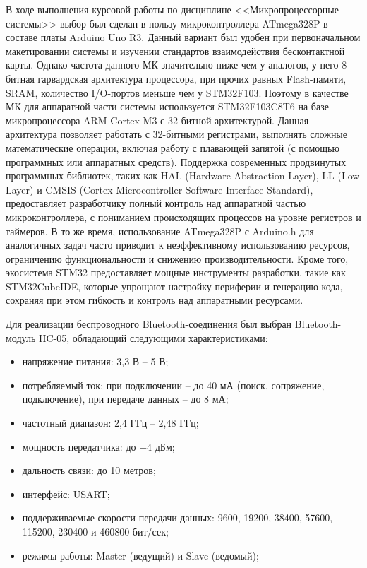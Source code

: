 В ходе выполнения курсовой работы по дисциплине <<Микропроцессорные системы>> выбор был сделан в пользу микроконтроллера ATmega328P в составе платы Arduino Uno R3.
Данный вариант был удобен при первоначальном макетировании системы и изучении стандартов взаимодействия бесконтактной карты.
Однако частота данного МК значительно ниже чем у аналогов, у него 8-битная гарвардская архитектура процессора, при прочих равных Flash-памяти, SRAM, количество I/O-портов меньше чем у STM32F103.
Поэтому в качестве МК для аппаратной части системы используется STM32F103C8T6 на базе микропроцессора ARM Cortex-M3 с 32-битной архитектурой.
Данная архитектура позволяет работать с 32-битными регистрами, выполнять сложные математические операции, включая работу с плавающей запятой (с помощью программных или аппаратных средств).
Поддержка современных продвинутых программных библиотек, таких как HAL (Hardware Abstraction Layer), LL (Low Layer) и CMSIS (Cortex Microcontroller Software Interface Standard), предоставляет разработчику полный контроль над аппаратной частью микроконтроллера, с пониманием происходящих процессов на уровне регистров и таймеров.
В то же время, использование ATmega328P с Arduino.h для аналогичных задач часто приводит к неэффективному использованию ресурсов, ограничению функциональности и снижению производительности.
Кроме того, экосистема STM32 предоставляет мощные инструменты разработки, такие как STM32CubeIDE, которые упрощают настройку периферии и генерацию кода, сохраняя при этом гибкость и контроль над аппаратными ресурсами.

Для реализации беспроводного Bluetooth-соединения был выбран Bluetooth-модуль HC-05, обладающий следующими характеристиками:

\begin{itemize}
    \item напряжение питания: 3,3 В – 5 В;
    \item потребляемый ток: при подключении – до 40 мА (поиск, сопряжение, подключение), при передаче данных – до 8 мА;
    \item частотный диапазон: 2,4 ГГц – 2,48 ГГц;
    \item мощность передатчика: до +4 дБм;
    \item дальность связи: до 10 метров;
    \item интерфейс: USART;
    \item поддерживаемые скорости передачи данных: 9600, 19200, 38400, 57600, 115200, 230400 и 460800 бит/сек;
    \item режимы работы: Master (ведущий) и Slave (ведомый);
\end{itemize}

